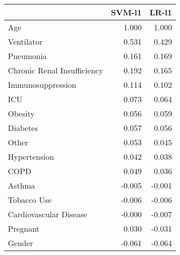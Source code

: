 \begin{tabular}{lrr}
\toprule
{} &  SVM-l1 &  LR-l1 \\
\midrule
Age                         &   1.000 &  1.000 \\
Ventilator                  &   0.531 &  0.429 \\
Pneumonia                   &   0.161 &  0.169 \\
Chronic Renal Insufficiency &   0.192 &  0.165 \\
Immunosuppression           &   0.114 &  0.102 \\
ICU                         &   0.073 &  0.064 \\
Obesity                     &   0.056 &  0.059 \\
Diabetes                    &   0.057 &  0.056 \\
Other                       &   0.053 &  0.045 \\
Hypertension                &   0.042 &  0.038 \\
COPD                        &   0.049 &  0.036 \\
Asthma                      &  -0.005 & -0.001 \\
Tobacco Use                 &  -0.006 & -0.006 \\
Cardiovascular Disease      &  -0.000 & -0.007 \\
Pregnant                    &   0.030 & -0.031 \\
Gender                      &  -0.061 & -0.064 \\
\bottomrule
\end{tabular}
